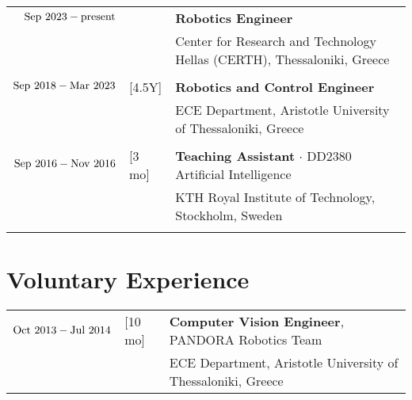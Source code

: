 \documentclass[a4paper,10pt,twoside]{article}
\begin{document}
\begin{tabular}{rlp{12cm}}
$\textnormal{Sep }2023- \hfill \textnormal{present} \hfill$ & & \textbf{Robotics Engineer} \\
                                                            & & \small{Center for Research and Technology Hellas (CERTH), Thessaloniki, Greece}\\\vspace{-7pt}
&\\
$\textnormal{Sep }2018 - \textnormal{Mar } 2023$ & \hspace{-0.4cm} [4.5Y] & \textbf{Robotics and Control Engineer} \\
                                                 & \hspace{-0.4cm}        & \small{ECE Department, Aristotle University of Thessaloniki, Greece}\\\vspace{-7pt}
&\\
$\textnormal{Sep }2016 - \textnormal{Nov } 2016$ & \hspace{-0.4cm} [3 mo] & \textbf{Teaching Assistant} $\cdot$ DD2380 Artificial Intelligence\\
                                                 & \hspace{-0.4cm}        & \small{KTH Royal Institute of Technology, Stockholm, Sweden}\\\vspace{-7pt}
& \vspace{-3pt}
\end{tabular}


\section{Voluntary Experience}

\begin{tabular}{rlp{12cm}}
$\textnormal{Oct }2013 - \textnormal{Jul }2014$ & \hspace{-0.4cm} [10 mo] & \textbf{Computer Vision Engineer}, PANDORA Robotics Team \\
                    & & ECE Department, Aristotle University of Thessaloniki, Greece
\end{tabular}
\end{document}
